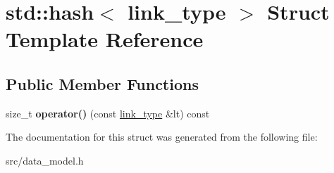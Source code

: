 \hypertarget{structstd_1_1hash_3_01link__type_01_4}{}\section{std\+:\+:hash$<$ link\+\_\+type $>$ Struct Template Reference}
\label{structstd_1_1hash_3_01link__type_01_4}
\subsection*{Public Member Functions}
\begin{DoxyCompactItemize}
\item 
\mbox{\label{structstd_1_1hash_3_01link__type_01_4_a20be12b656a0b779b9b18ebf4b89edaf}} 
size\+\_\+t {\bfseries operator()} (const \hyperlink{structlink__type}{link\+\_\+type} \&lt) const
\end{DoxyCompactItemize}


The documentation for this struct was generated from the following file\+:\begin{DoxyCompactItemize}
\item 
src/data\+\_\+model.\+h\end{DoxyCompactItemize}
